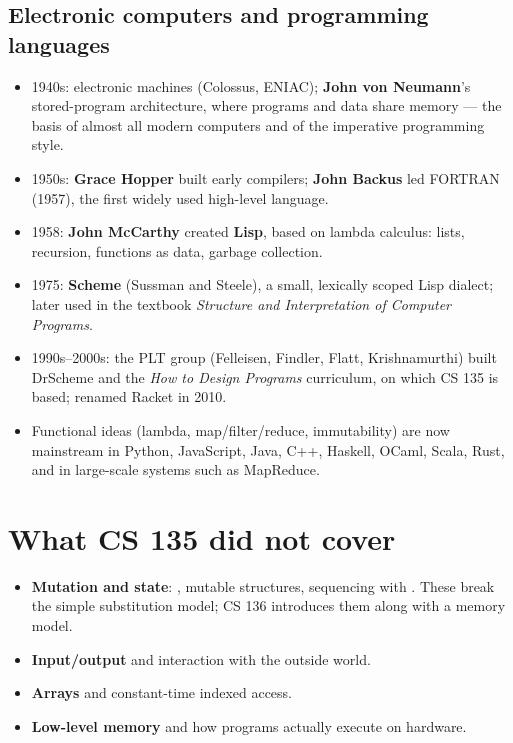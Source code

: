 \subsection{Electronic computers and programming languages}
\begin{itemize}
  \item 1940s: electronic machines (Colossus, ENIAC); \textbf{John von Neumann}'s stored-program architecture, where programs and data share memory --- the basis of almost all modern computers and of the imperative programming style.
  \item 1950s: \textbf{Grace Hopper} built early compilers; \textbf{John Backus} led FORTRAN (1957), the first widely used high-level language.
  \item 1958: \textbf{John McCarthy} created \textbf{Lisp}, based on lambda calculus: lists, recursion, functions as data, garbage collection.
  \item 1975: \textbf{Scheme} (Sussman and Steele), a small, lexically scoped Lisp dialect; later used in the textbook \emph{Structure and Interpretation of Computer Programs}.
  \item 1990s--2000s: the PLT group (Felleisen, Findler, Flatt, Krishnamurthi) built DrScheme and the \emph{How to Design Programs} curriculum, on which CS 135 is based; renamed Racket in 2010.
  \item Functional ideas (lambda, map/filter/reduce, immutability) are now mainstream in Python, JavaScript, Java, C++, Haskell, OCaml, Scala, Rust, and in large-scale systems such as MapReduce.
\end{itemize}

\section{What CS 135 did not cover}
\begin{itemize}
  \item \textbf{Mutation and state}: , mutable structures, sequencing with . These break the simple substitution model; CS 136 introduces them along with a memory model.
  \item \textbf{Input/output} and interaction with the outside world.
  \item \textbf{Arrays} and constant-time indexed access.
  \item \textbf{Low-level memory} and how programs actually execute on hardware.
\end{itemize}

